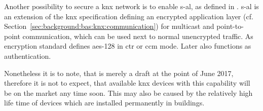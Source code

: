 Another possibility to secure a \gls{knx} network is to enable \gls{s-al}, as defined in \textcite{DIN_EN_50090-3-4}. \Gls{s-al} is an extension of the \gls{knx} specification defining an encrypted application layer (cf. Section~\ref{sec:background:bas:knx:communication}) for multicast and point-to-point communication, which can be used next to normal unencrypted traffic.
As encryption standard \textcite{DIN_EN_50090-3-4} defines \acs{aes}-128 in \gls{ctr} or \gls{ccm} mode.
Later also functions as authentication. 

Nonetheless it is to note, that \textcite{DIN_EN_50090-3-4} is merely a draft at the point of June 2017, therefore it is not to expect, that available \gls{knx} devices with this capability will be on the market any time soon. This may also be caused by the relatively high life time of devices which are installed permanently in buildings.



